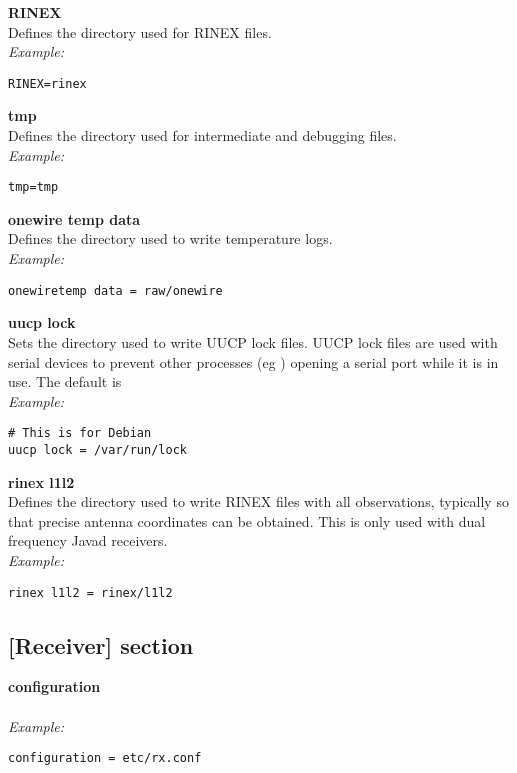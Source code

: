 {\bfseries RINEX}\\
Defines the directory used for RINEX files.\\
\textit{Example:}
\begin{lstlisting}
RINEX=rinex
\end{lstlisting}

{\bfseries tmp}\\
Defines the directory used for intermediate and debugging files.\\
\textit{Example:}
\begin{lstlisting}
tmp=tmp
\end{lstlisting}

{\bfseries onewire temp data}\\
Defines the directory used to write temperature logs.\\
\textit{Example:}
\begin{lstlisting}
onewiretemp data = raw/onewire
\end{lstlisting}

{\bfseries uucp lock}\\
Sets the directory used to write UUCP lock files. UUCP lock files are used with serial devices to prevent
other processes (eg ) opening a serial port while it is in use. The default is \\
\textit{Example:}
\begin{lstlisting}
# This is for Debian
uucp lock = /var/run/lock
\end{lstlisting}

{\bfseries rinex l1l2}\\ \hypertarget{h:rinex_l1l2}{}
Defines the directory used to write RINEX files with all observations, typically so that precise antenna coordinates
can be obtained. This is only used with dual frequency Javad receivers.\\
\textit{Example:}
\begin{lstlisting}
rinex l1l2 = rinex/l1l2
\end{lstlisting}


\subsection{[Receiver] section \label{sgcreceiver}}

\hypertarget{h:receiver}{}

{\bfseries configuration}\\
\\
\textit{Example:}
\begin{lstlisting}
configuration = etc/rx.conf
\end{lstlisting}

